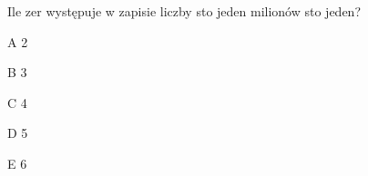 \begin{tresc}
Ile zer występuje w zapisie liczby sto jeden milionów sto jeden?
\end{tresc}
\begin{wariant}{A} 2 \end{wariant}
\begin{wariant}{B} 3 \end{wariant}
\begin{wariant}{C} 4 \end{wariant}
\begin{wariant}{D} 5 \end{wariant}
\begin{wariant}{E} 6 \end{wariant}
